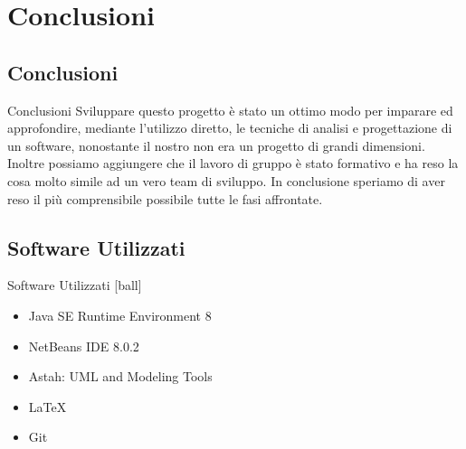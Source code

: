 \section {Conclusioni}
\subsection{Conclusioni}
 \begin{frame} {Conclusioni}
  Sviluppare questo progetto è stato un ottimo modo per imparare ed approfondire, mediante l'utilizzo diretto, le tecniche di analisi e progettazione di un software, 
  nonostante il nostro non era un progetto di grandi dimensioni. Inoltre possiamo aggiungere che il lavoro di gruppo è stato formativo e ha reso la cosa molto simile 
  ad un vero team di sviluppo. In conclusione speriamo di aver reso il più comprensibile possibile tutte le fasi affrontate.
 \end{frame}

\subsection{Software Utilizzati}
 \begin{frame} {Software Utilizzati}
  [ball]
  \begin{itemize} 
    \item Java SE Runtime Environment 8
    \item NetBeans IDE 8.0.2 
    \item Astah: UML and Modeling Tools
    \item \LaTeX
    \item Git
   \end{itemize}
 \end{frame}


